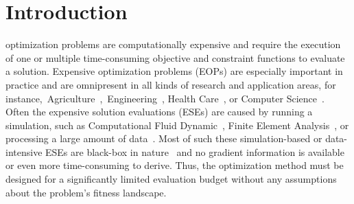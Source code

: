 \documentclass[journal]{IEEEtran}
\begin{document}
%
\IEEEpeerreviewmaketitle



\section{Introduction}



 optimization problems are computationally expensive and require the execution of one or multiple time-consuming objective and constraint functions to evaluate a solution. Expensive optimization problems (EOPs) are especially important in practice and are omnipresent in all kinds of research and application areas, for instance,~Agriculture~\cite{2019-roy-crop-yield},~Engineering~\cite{2016-yin-crashwrothiness-design}, Health Care~\cite{2016-lucidi-application-health}, or Computer Science~\cite{2019-lu-nsga-net}. Often the expensive solution evaluations (ESEs) are caused by running a simulation, such as Computational Fluid Dynamic~\cite{1995-anderson-cfd}, Finite Element Analysis~\cite{1991-szabo-fea}, or processing a large amount of data~\cite{2019-luo-data-driven,2020-wang-data-driven-forest}.
Most of such these simulation-based or data-intensive ESEs are black-box in nature~\cite{2002-olafsson-simopt} and no gradient information is available or even more time-consuming to derive.
Thus, the optimization method must be designed for a significantly limited evaluation budget without any assumptions about the problem's fitness landscape.
\end{document}
